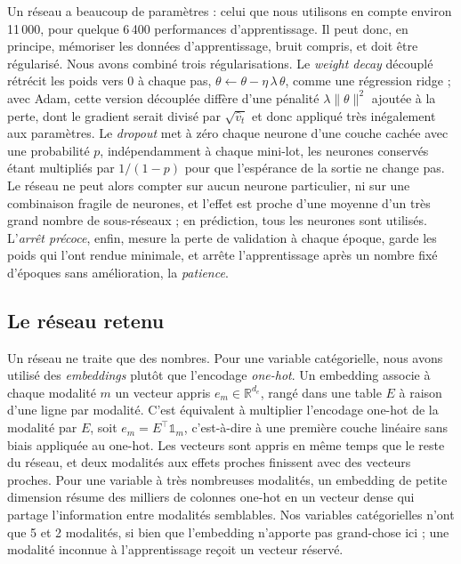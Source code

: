 \documentclass[11pt,a4paper]{article}
\begin{document}
Un réseau a beaucoup de paramètres : celui que nous utilisons en compte environ 11\,000, pour quelque 6\,400
performances d'apprentissage. Il peut donc, en principe, mémoriser les données d'apprentissage, bruit compris, et doit
être régularisé. Nous avons combiné trois régularisations. Le \emph{weight decay} découplé \citep{loshchilov2019}
rétrécit les poids vers 0 à chaque pas, $\theta \leftarrow \theta - \eta\,\lambda\,\theta$, comme une régression
ridge ; avec Adam, cette version découplée diffère d'une pénalité $\lambda\lVert\theta\rVert^2$ ajoutée à la perte,
dont le gradient serait divisé par $\sqrt{\hat v_t}$ et donc appliqué très inégalement aux paramètres. Le
\emph{dropout} \citep{srivastava2014} met à zéro chaque neurone d'une couche cachée avec une probabilité $p$,
indépendamment à chaque mini-lot, les neurones conservés étant multipliés par $1/(1 - p)$ pour que l'espérance de la
sortie ne change pas. Le réseau ne peut alors compter sur aucun neurone particulier, ni sur une combinaison fragile de
neurones, et l'effet est proche d'une moyenne d'un très grand nombre de sous-réseaux ; en prédiction, tous les
neurones sont utilisés. L'\emph{arrêt précoce}, enfin, mesure la perte de validation à chaque époque, garde les poids
qui l'ont rendue minimale, et arrête l'apprentissage après un nombre fixé d'époques sans amélioration, la
\emph{patience}.

\subsection{Le réseau retenu}\label{sec:architecture}

Un réseau ne traite que des nombres. Pour une variable catégorielle, nous avons utilisé des \emph{embeddings} plutôt
que l'encodage \emph{one-hot}. Un embedding associe à chaque modalité $m$ un vecteur appris $e_m \in \mathbb{R}^{d_e}$,
rangé dans une table $E$ à raison d'une ligne par modalité. C'est équivalent à multiplier l'encodage one-hot de la
modalité par $E$, soit $e_m = E^\top \mathbb 1_m$, c'est-à-dire à une première couche linéaire sans biais appliquée au
one-hot. Les vecteurs sont appris en même temps que le reste du réseau, et deux modalités aux effets proches
finissent avec des vecteurs proches. Pour une variable à très nombreuses modalités, un embedding de petite dimension
résume des milliers de colonnes one-hot en un vecteur dense qui partage l'information entre modalités semblables. Nos
variables catégorielles n'ont que 5 et 2 modalités, si bien que l'embedding n'apporte pas grand-chose ici ; une
modalité inconnue à l'apprentissage reçoit un vecteur réservé.
\end{document}
